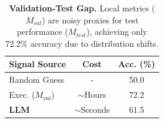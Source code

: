 \begin{table}[h]
    \centering
    \small
    \begin{tabular}{lcc}
    \toprule
    \textbf{Signal Source} & \textbf{Cost} & \textbf{Acc. (\%)} \\
    \midrule
    Random Guess & - & 50.0 \\
    Exec. ($M_{val}$) & $\sim$Hours & 72.2 \\
    \textbf{LLM} & $\sim$Seconds & 61.5 \\
    \bottomrule
    \end{tabular}
    \caption{\textbf{Validation-Test Gap.} Local metrics ($M_{val}$) are noisy proxies for test performance ($M_{test}$), achieving only 72.2\% accuracy due to distribution shifts.}
    \vspace{-15pt}
    \label{tab:gap_analysis}
\end{table}